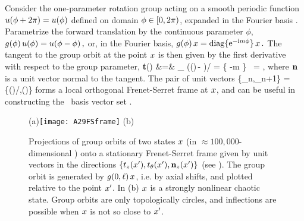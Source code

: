 Consider the one-parameter rotation group  acting on a smooth
periodic function $u({\bf \phi} + 2\pi) = u({\bf \phi})$ defined on domain
${\bf \phi} \in [0,2\pi)$, expanded in the Fourier basis
.
Parametrize the forward
translation by the continuous parameter $\phi$,
\(
    g(\phi)\,u({\bf \phi}) = u({\bf \phi}-\phi)
\,,
\)
or, in the Fourier basis,
\(
   g(\phi) \,x = \mathrm{diag}\{ \mathrm{e}^{-\mathrm{i}m\phi} \} \,x
\,.
\)
The tangent to the group orbit at the point $\ssp$ is then given by
the first derivative with respect to the group parameter,
\bea
   {\bf t}(\ssp) &=&
   \lim_{\gSpace{}}
   \left(\LieEl(\gSpace)\,\ssp - \ssp\right)/\gSpace
   = \{ -m \} \, \ssp = \Lg \ssp,
\label{eq:tang}
\eea
where $\mathbf{n}$ is a unit vector normal to the tangent. The pair of unit vectors
    \PC{2011-10-28
    ``As $\Norm{\LieEl(\gSpace)\slicep}$ is a constant, for the group tangent
    vector $\Lg_\gSpace \slicep$ evaluated at $\slicep$ \refeq{eq:tang}
    $\braket{\slicep}{\Lg_\theta\,\slicep}$ vanishes ($\Lg_{\theta}$ is
    antisymmetric).''
The state vector $\ssp$ is not normal to \normVec(\ssp), as $\braket{\ssp
\Lg^2}{\ssp} = - \Norm{\groupTan(\ssp)}^2 \neq 0$, but can one use it to
produce from $\ssp$ the 3. local eigenbasis unit vector? Have not thought
that through. If we do that here, need to rewrite text leading to
\refeq{PCsectQ0}.
    }
\beq
\{{\be_n},{\be_{n+1}}\} =
\{\groupTan(\ssp)/\Norm{\groupTan(\ssp)},\normVec(\ssp)\}
forms a local orthogonal Frenet-Serret frame at $\ssp$, and can be useful
in constructing the \statesp\ basis vector set .

\begin{figure}
  \centering
(a)\texttt{[image: A29FSframe]}
(b)%
  \caption{\label{fig:2840GOt135th0}
Projections of group orbits of two states $\ssp$ (in $\approx
100,000$-dimensional {\statesp}) onto a stationary Frenet-Serret frame
given by unit vectors in the directions
$\{t_z(x'),t_\theta(x'),\mathbf{n}_z(x')\}$ (see
). The group orbit is generated by
$g(0,\ell)\,x$, i.e. by axial shifts, and plotted relative to the
point $x'$.
In  (b) $\ssp$ is a strongly nonlinear chaotic state.
Group orbits are only topologically circles, and inflections are possible
when $\ssp$ is not so close to $x'$.
  }
\end{figure}

